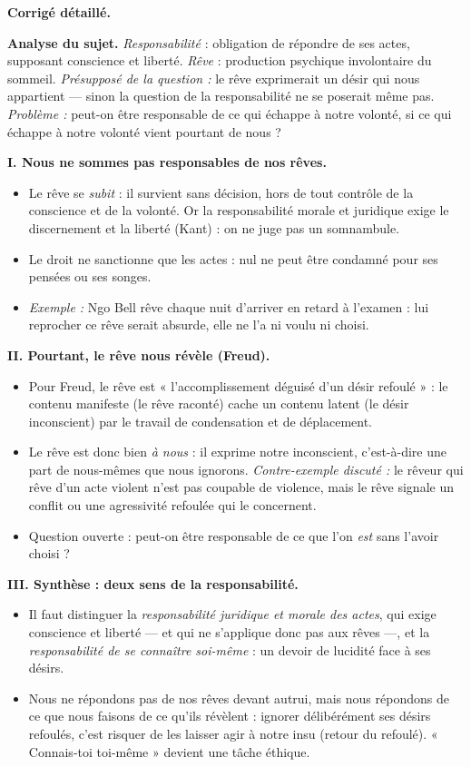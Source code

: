 \documentclass[11pt]{article}
\begin{document}
\begin{corrige}
\textbf{Corrigé détaillé.}

\textbf{Analyse du sujet.} \emph{Responsabilité} : obligation de répondre de ses actes, supposant conscience et liberté. \emph{Rêve} : production psychique involontaire du sommeil. \emph{Présupposé de la question :} le rêve exprimerait un désir qui nous appartient — sinon la question de la responsabilité ne se poserait même pas. \emph{Problème :} peut-on être responsable de ce qui échappe à notre volonté, si ce qui échappe à notre volonté vient pourtant de nous ?

\textbf{I. Nous ne sommes pas responsables de nos rêves.}
\begin{itemize}
\item Le rêve se \emph{subit} : il survient sans décision, hors de tout contrôle de la conscience et de la volonté. Or la responsabilité morale et juridique exige le discernement et la liberté (Kant) : on ne juge pas un somnambule.
\item Le droit ne sanctionne que les actes : nul ne peut être condamné pour ses pensées ou ses songes.
\item \emph{Exemple :} Ngo Bell rêve chaque nuit d'arriver en retard à l'examen : lui reprocher ce rêve serait absurde, elle ne l'a ni voulu ni choisi.
\end{itemize}

\textbf{II. Pourtant, le rêve nous révèle (Freud).}
\begin{itemize}
\item Pour Freud, le rêve est « l'accomplissement déguisé d'un désir refoulé » : le contenu manifeste (le rêve raconté) cache un contenu latent (le désir inconscient) par le travail de condensation et de déplacement.
\item Le rêve est donc bien \emph{à nous} : il exprime notre inconscient, c'est-à-dire une part de nous-mêmes que nous ignorons. \emph{Contre-exemple discuté :} le rêveur qui rêve d'un acte violent n'est pas coupable de violence, mais le rêve signale un conflit ou une agressivité refoulée qui le concernent.
\item Question ouverte : peut-on être responsable de ce que l'on \emph{est} sans l'avoir choisi ?
\end{itemize}

\textbf{III. Synthèse : deux sens de la responsabilité.}
\begin{itemize}
\item Il faut distinguer la \emph{responsabilité juridique et morale des actes}, qui exige conscience et liberté — et qui ne s'applique donc pas aux rêves —, et la \emph{responsabilité de se connaître soi-même} : un devoir de lucidité face à ses désirs.
\item Nous ne répondons pas de nos rêves devant autrui, mais nous répondons de ce que nous faisons de ce qu'ils révèlent : ignorer délibérément ses désirs refoulés, c'est risquer de les laisser agir à notre insu (retour du refoulé). « Connais-toi toi-même » devient une tâche éthique.
\end{itemize}


\end{corrige}
\end{document}
